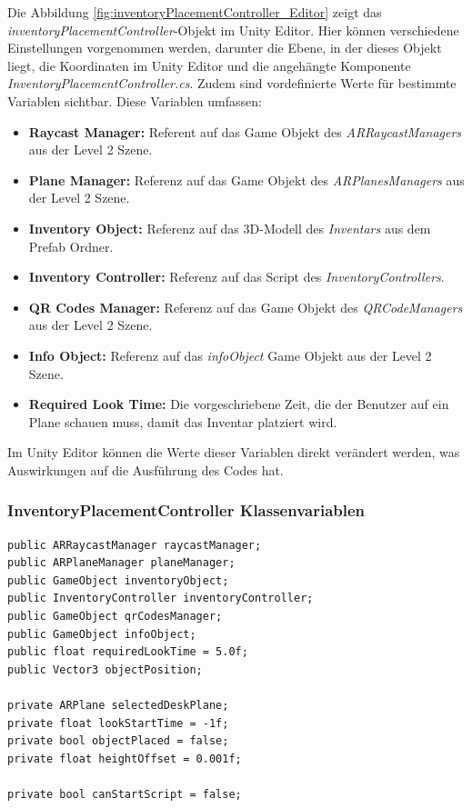 Die Abbildung \ref{fig:inventoryPlacementController_Editor} zeigt das \textit{inventoryPlacementController}-Objekt im Unity Editor. Hier
können verschiedene Einstellungen vorgenommen werden, darunter die Ebene, in der dieses Objekt liegt, die Koordinaten
im Unity Editor und die angehängte Komponente \textit{InventoryPlacementController.cs}. Zudem sind vordefinierte Werte für bestimmte
Variablen sichtbar. Diese Variablen umfassen:

\begin{itemize}
    \item \textbf{Raycast Manager:} Referent auf das Game Objekt des \textit{ARRaycastManagers} aus der Level 2 Szene.
    \item \textbf{Plane Manager:} Referenz auf das Game Objekt des \textit{ARPlanesManagers} aus der Level 2 Szene.
    \item \textbf{Inventory Object:} Referenz auf das 3D-Modell des \textit{Inventars} aus dem Prefab Ordner.
    \item \textbf{Inventory Controller:} Referenz auf das Script des \textit{InventoryControllers}.
    \item \textbf{QR Codes Manager:} Referenz auf das Game Objekt des \textit{QRCodeManagers} aus der Level 2 Szene.
    \item \textbf{Info Object:} Referenz auf das \textit{infoObject} Game Objekt aus der Level 2 Szene.
    \item \textbf{Required Look Time:} Die vorgeschriebene Zeit, die der Benutzer auf ein Plane schauen muss, damit das
    Inventar platziert wird.
\end{itemize}

Im Unity Editor können die Werte dieser Variablen direkt verändert werden, was Auswirkungen auf die Ausführung des Codes hat.\\

\subsubsection{InventoryPlacementController Klassenvariablen}
\begin{lstlisting}[style=csharp, caption={Klassenvariablen der InventoryPlacementController Klasse}, label=code:anchor_var]
public ARRaycastManager raycastManager;
public ARPlaneManager planeManager;
public GameObject inventoryObject;
public InventoryController inventoryController;
public GameObject qrCodesManager;
public GameObject infoObject;
public float requiredLookTime = 5.0f;
public Vector3 objectPosition;

private ARPlane selectedDeskPlane;
private float lookStartTime = -1f;
private bool objectPlaced = false;
private float heightOffset = 0.001f;

private bool canStartScript = false;
\end{lstlisting}

